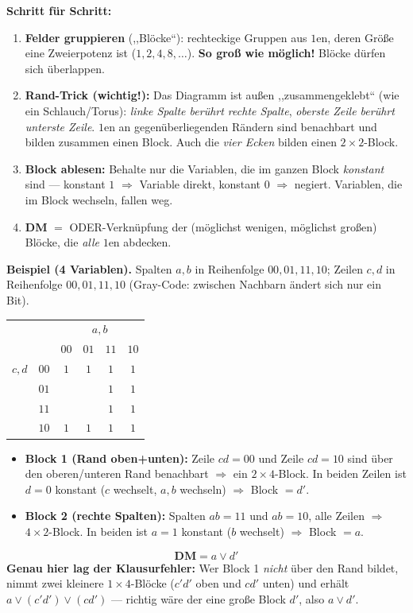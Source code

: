 \documentclass[a4paper,11pt]{article}
\begin{document}
\begin{vorgehen}
\textbf{Schritt für Schritt:}
\begin{enumerate}[nosep,leftmargin=1.6em]
  \item \textbf{Felder gruppieren} (,,Blöcke``): rechteckige Gruppen aus $1$en, deren Größe eine Zweierpotenz ist ($1,2,4,8,\dots$). \textbf{So groß wie möglich!} Blöcke dürfen sich überlappen.
  \item \textbf{Rand-Trick (wichtig!):} Das Diagramm ist außen ,,zusammengeklebt`` (wie ein Schlauch/Torus): \emph{linke Spalte berührt rechte Spalte}, \emph{oberste Zeile berührt unterste Zeile}. $1$en an gegenüberliegenden Rändern sind benachbart und bilden zusammen einen Block. Auch die \emph{vier Ecken} bilden einen $2\times2$-Block.
  \item \textbf{Block ablesen:} Behalte nur die Variablen, die im ganzen Block \emph{konstant} sind --- konstant $1$ $\Rightarrow$ Variable direkt, konstant $0$ $\Rightarrow$ negiert. Variablen, die im Block wechseln, fallen weg.
  \item \textbf{DM} $=$ ODER-Verknüpfung der (möglichst wenigen, möglichst großen) Blöcke, die \emph{alle} $1$en abdecken.
\end{enumerate}
\textbf{Beispiel (4 Variablen).} Spalten $a,b$ in Reihenfolge $00,01,11,10$; Zeilen $c,d$ in Reihenfolge $00,01,11,10$ (Gray-Code: zwischen Nachbarn ändert sich nur ein Bit).
\par\vspace{1mm}
\begin{center}
\renewcommand{\arraystretch}{1.3}
\begin{tabular}{cc|cccc}
 & & \multicolumn{4}{c}{$a,b$}\\
 & & $00$ & $01$ & $11$ & $10$\\\hline
$c,d$
 & $00$ & $1$ & $1$ & $1$ & $1$\\
 & $01$ &     &     & $1$ & $1$\\
 & $11$ &     &     & $1$ & $1$\\
 & $10$ & $1$ & $1$ & $1$ & $1$\\
\end{tabular}
\renewcommand{\arraystretch}{1}
\end{center}
\begin{itemize}[nosep,leftmargin=1.4em]
  \item \textbf{Block 1 (Rand oben+unten):} Zeile $cd{=}00$ und Zeile $cd{=}10$ sind über den oberen/unteren Rand benachbart $\Rightarrow$ ein $2\times4$-Block. In beiden Zeilen ist $d=0$ konstant ($c$ wechselt, $a,b$ wechseln) $\Rightarrow$ Block $=d'$.
  \item \textbf{Block 2 (rechte Spalten):} Spalten $ab{=}11$ und $ab{=}10$, alle Zeilen $\Rightarrow$ $4\times2$-Block. In beiden ist $a=1$ konstant ($b$ wechselt) $\Rightarrow$ Block $=a$.
\end{itemize}
\[
\boxed{\textbf{DM} = a\vee d'}
\]
\textbf{Genau hier lag der Klausurfehler:} Wer Block 1 \emph{nicht} über den Rand bildet, nimmt zwei kleinere $1\times4$-Blöcke ($c'd'$ oben und $cd'$ unten) und erhält $a\vee(c'd')\vee(cd')$ --- richtig wäre der eine große Block $d'$, also $a\vee d'$.
\end{vorgehen}
\end{document}
